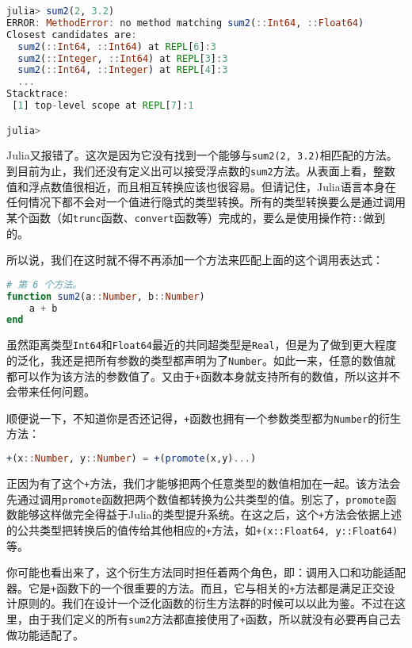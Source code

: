 \begin{lstlisting}[language=julia]
julia> sum2(2, 3.2)
ERROR: MethodError: no method matching sum2(::Int64, ::Float64)
Closest candidates are:
  sum2(::Int64, ::Int64) at REPL[6]:3
  sum2(::Integer, ::Int64) at REPL[3]:3
  sum2(::Int64, ::Integer) at REPL[4]:3
  ...
Stacktrace:
 [1] top-level scope at REPL[7]:1

julia> 
\end{lstlisting}

Julia又报错了。这次是因为它没有找到一个能够与\verb|sum2(2, 3.2)|相匹配的方法。到目前为止，我们还没有定义出可以接受浮点数的\verb|sum2|方法。从表面上看，整数值和浮点数值很相近，而且相互转换应该也很容易。但请记住，Julia语言本身在任何情况下都不会对一个值进行隐式的类型转换。所有的类型转换要么是通过调用某个函数（如\verb|trunc|函数、\verb|convert|函数等）完成的，要么是使用操作符\verb|::|做到的。

所以说，我们在这时就不得不再添加一个方法来匹配上面的这个调用表达式：

\begin{lstlisting}[language=julia]
# 第 6 个方法。
function sum2(a::Number, b::Number)
    a + b
end
\end{lstlisting}

虽然距离类型\verb|Int64|和\verb|Float64|最近的共同超类型是\verb|Real|，但是为了做到更大程度的泛化，我还是把所有参数的类型都声明为了\verb|Number|。如此一来，任意的数值就都可以作为该方法的参数值了。又由于\verb|+|函数本身就支持所有的数值，所以这并不会带来任何问题。

顺便说一下，不知道你是否还记得，\verb|+|函数也拥有一个参数类型都为\verb|Number|的衍生方法：

\begin{lstlisting}[language=julia]
+(x::Number, y::Number) = +(promote(x,y)...)
\end{lstlisting}

正因为有了这个\verb|+|方法，我们才能够把两个任意类型的数值相加在一起。该方法会先通过调用\verb|promote|函数把两个数值都转换为公共类型的值。别忘了，\verb|promote|函数能够这样做完全得益于Julia的类型提升系统。在这之后，这个\verb|+|方法会依据上述的公共类型把转换后的值传给其他相应的\verb|+|方法，如\verb|+(x::Float64, y::Float64)|等。

你可能也看出来了，这个衍生方法同时担任着两个角色，即：调用入口和功能适配器。它是\verb|+|函数下的一个很重要的方法。而且，它与相关的\verb|+|方法都是满足正交设计原则的。我们在设计一个泛化函数的衍生方法群的时候可以以此为鉴。不过在这里，由于我们定义的所有\verb|sum2|方法都直接使用了\verb|+|函数，所以就没有必要再自己去做功能适配了。

